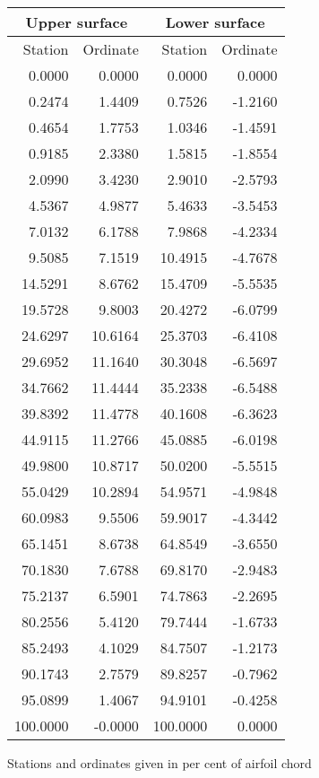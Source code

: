 \documentclass[11pt]{book}
\begin{document}
 \hspace{4mm}
 \begin{tabular}{|r|r|r|r|} \hline 
 \multicolumn{2}{|c|}{Upper surface} & \multicolumn{2}{|c|}{Lower surface} \\
 \hline
 Station & Ordinate & Station & Ordinate \\
 \hline
0.0000 & 0.0000 & 0.0000 & 0.0000 \\
0.2474 & 1.4409 & 0.7526 & -1.2160 \\
0.4654 & 1.7753 & 1.0346 & -1.4591 \\
0.9185 & 2.3380 & 1.5815 & -1.8554 \\
2.0990 & 3.4230 & 2.9010 & -2.5793 \\
4.5367 & 4.9877 & 5.4633 & -3.5453 \\
7.0132 & 6.1788 & 7.9868 & -4.2334 \\
9.5085 & 7.1519 & 10.4915 & -4.7678 \\
14.5291 & 8.6762 & 15.4709 & -5.5535 \\
19.5728 & 9.8003 & 20.4272 & -6.0799 \\
24.6297 & 10.6164 & 25.3703 & -6.4108 \\
29.6952 & 11.1640 & 30.3048 & -6.5697 \\
34.7662 & 11.4444 & 35.2338 & -6.5488 \\
39.8392 & 11.4778 & 40.1608 & -6.3623 \\
44.9115 & 11.2766 & 45.0885 & -6.0198 \\
49.9800 & 10.8717 & 50.0200 & -5.5515 \\
55.0429 & 10.2894 & 54.9571 & -4.9848 \\
60.0983 & 9.5506 & 59.9017 & -4.3442 \\
65.1451 & 8.6738 & 64.8549 & -3.6550 \\
70.1830 & 7.6788 & 69.8170 & -2.9483 \\
75.2137 & 6.5901 & 74.7863 & -2.2695 \\
80.2556 & 5.4120 & 79.7444 & -1.6733 \\
85.2493 & 4.1029 & 84.7507 & -1.2173 \\
90.1743 & 2.7579 & 89.8257 & -0.7962 \\
95.0899 & 1.4067 & 94.9101 & -0.4258 \\
100.0000 & -0.0000 & 100.0000 & 0.0000 \\
 \hline 
 \end{tabular}
 \vspace{8mm}

Stations and ordinates given in per cent of airfoil chord
\end{document}
